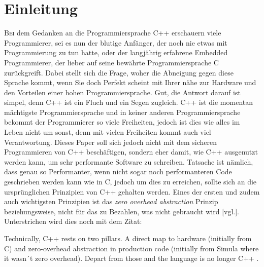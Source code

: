 \section{Einleitung}\label{sec:einleitung}
\lettrine{B}{ei} dem Gedanken an die Programmiersprache C++ erschauern viele Programmierer, sei
es nun der blutige Anfänger, der noch nie etwas mit Programmierung zu tun hatte, oder der
langjährig erfahrene Embedded Programmierer, der lieber auf seine bewährte Programmiersprache C
zurückgreift. Dabei stellt sich die Frage, woher die Abneigung gegen diese Sprache kommt, wenn
Sie doch Perfekt scheint mit Ihrer nähe zur Hardware und den Vorteilen einer hohen
Programmiersprache. Gut, die Antwort darauf ist simpel, denn C++ ist ein Fluch und ein Segen
zugleich. C++ ist die momentan mächtigste Programmiersprache und in keiner anderen
Programmiersprache bekommt der Programmierer so viele Freiheiten, jedoch ist dies wie alles im
Leben nicht um sonst, denn mit vielen Freiheiten kommt auch viel Verantwortung.
\newline
\newline
Dieses Paper soll sich jedoch nicht mit dem sicheren Programmieren von C++ beschäftigen, sondern
eher damit, wie C++ ausgenutzt werden kann, um sehr performante Software zu schreiben. Tatsache
ist nämlich, dass genau so Performanter, wenn nicht sogar noch performanteren Code geschrieben
werden kann wie in C, jedoch um dies zu erreichen, sollte sich an die ursprünglichen Prinzipien
von C++ gehalten werden. Eines der ersten und zudem auch wichtigsten Prinzipien ist das
\emph{zero overhead abstraction} Prinzip beziehungsweise, nicht für das zu Bezahlen, was nicht
gebraucht wird \cite{HandsOn}[vgl.]. Unterstrichen wird dies noch mit dem Zitat:

\begin{zitat}
    Technically, C++ rests on two pillars. A direct map to hardware (initially from C) and
    zero-overhead abstraction in production code (initially from Simula where it wasn´t zero
    overhead). Depart from those and the language is no longer C++ \cite{ISOC++}.
\end{zitat}


		
		
